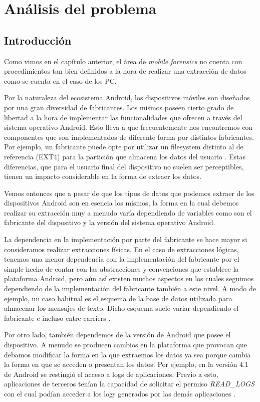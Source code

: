 \chapter{Análisis del problema} \label{chap:Analisis}

\section{Introducción}
Como vimos en el capítulo anterior, el área de \emph{mobile forensics} no cuenta con procedimientos tan bien definidos a la hora de realizar una extracción de datos como se cuenta en el caso de los PC.

Por la naturaleza del ecosistema Android, los dispositivos móviles son diseñados por una gran diversidad de fabricantes. Los mismos poseen cierto grado de libertad a la hora de implementar las funcionalidades que ofrecen a través del sistema operativo Android. Esto lleva a que frecuentemente nos encontremos con componentes que son implementados de diferente forma por distintos fabricantes. Por ejemplo, un fabricante puede opte por utilizar un filesystem distinto al de referencia (EXT4) para la partición que almacena los datos del usuario \cite{adrdstrg}. Estas diferencias, que para el usuario final del dispositivo no suelen ser perceptibles, tienen un impacto considerable en la forma de extraer los datos.

Vemos entonces que a pesar de que los tipos de datos que podemos extraer de los dispositivos Android son en esencia los mismos, la forma en la cual debemos realizar su extracción muy a menudo varía dependiendo de variables como son el fabricante del dispositivo y la versión del sistema operativo Android.

La dependencia en la implementación por parte del fabricante se hace mayor si consideramos realizar extracciones físicas. En el caso de extracciones lógicas, tenemos una menor dependencia con la implementación del fabricante por el simple hecho de contar con las abstracciones y convenciones que establece la plataforma Android, pero aún así existen muchos aspectos en los cuales seguimos dependiendo de la implementación del fabricante también a este nivel. A modo de ejemplo, un caso habitual es el esquema de la base de datos utilizada para almacenar los mensajes de texto. Dicho esquema suele variar dependiendo el fabricante e incluso entre carriers \cite{delsms}.

Por otro lado, también dependemos de la versión de Android que posee el dispositivo. A menudo se producen cambios en la plataforma que provocan que debamos modificar la forma en la que extraemos los datos ya sea porque cambia la forma en que se acceden o presentan los datos. Por ejemplo, en la versión 4.1 de Android se restingió el acceso a logs de aplicaciones. Previo a esto, aplicaciones de terceros tenían la capacidad de solicitar el permiso \emph{READ\_LOGS} con el cual podían acceder a los logs generados por las demás aplicaciones \cite{logaccss}.

